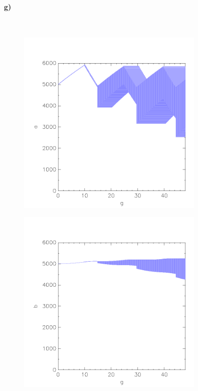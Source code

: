 \paragraph{g)}\mbox{} \\
\begin{minipage}[t]{0.5\textwidth} 
	\begin{figure}[H]
		\centering
		\includegraphics[width=0.8\textwidth]{Aufgabe_g1).png}
	\end{figure}
\end{minipage}
\hfill
\begin{minipage}[t]{0.5\textwidth} 
	\begin{figure}[H]
		\centering
		\includegraphics[width=0.8\textwidth]{Aufgabe_g2).png}
	\end{figure}
\end{minipage}\\ 

